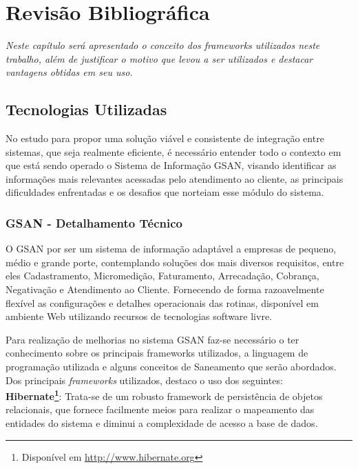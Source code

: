 \chapter[Revisão Bibliográfica]{\textbf{R}evisão \textbf{B}ibliográfica}

\textit{Neste capítulo será apresentado o conceito dos \textit{frameworks} utilizados neste trabalho, além de justificar o motivo que levou a ser utilizados e destacar vantagens obtidas em seu uso.}


\section{Tecnologias Utilizadas}

No estudo para propor uma solução viável e consistente de integração entre sistemas, que seja realmente eficiente, é necessário entender todo o contexto em que está sendo operado o Sistema de Informação GSAN, visando identificar as informações mais relevantes acessadas pelo atendimento ao cliente, as principais dificuldades enfrentadas e os desafios que norteiam esse módulo do sistema. 


\subsection{GSAN - Detalhamento Técnico }

O GSAN por ser um sistema de informação adaptável a empresas de pequeno, médio e grande porte, contemplando soluções dos mais diversos requisitos, entre eles Cadastramento, Micromedição, Faturamento, Arrecadação, Cobrança, Negativação e Atendimento ao Cliente. Fornecendo de forma razoavelmente flexível as configurações e detalhes operacionais das rotinas, disponível em ambiente Web utilizando recursos de tecnologias software livre.

Para realização de melhorias no sistema GSAN faz-se necessário o ter conhecimento sobre os principais frameworks utilizados, a linguagem de programação utilizada e alguns conceitos de Saneamento que serão abordados.
Dos principais \textit{frameworks} utilizados, destaco o uso dos seguintes: \\

\textbf{Hibernate\footnote{Disponível em \url{http://www.hibernate.org}}}: Trata-se de um robusto framework de persistência de objetos relacionais, que fornece facilmente meios para realizar o mapeamento das entidades do sistema e diminui a complexidade de acesso a base de dados.\\

